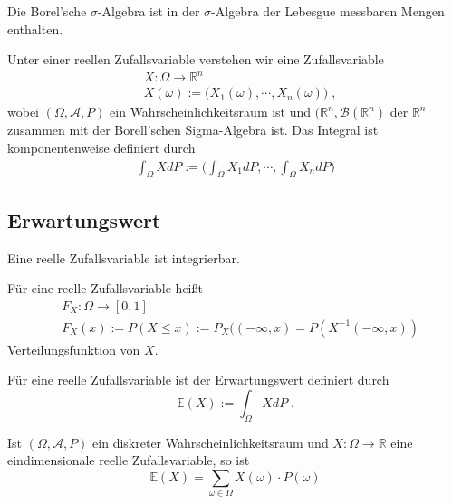 \begin{Satz}
Die Borel'sche   $\sigma$-Algebra ist in der $\sigma$-Algebra der Lebesgue messbaren Mengen enthalten.
\end{Satz}

\begin{Definition}
Unter einer reellen Zufallsvariable verstehen wir eine Zufallsvariable 
\begin{align*}
& X : \Omega \to \mathbb{R}^n \\
& X(\omega) := \biggl(X_1(\omega), \cdots , X_n(\omega)  \biggr) \; ,
\end{align*}
wobei $(\Omega, \mathcal{A}, P)$ ein Wahrscheinlichkeitsraum ist und $(\mathbb{R}^n, \mathcal{B}(\mathbb{R}^n)$ der $\mathbb{R}^n$ zusammen mit der Borell'schen Sigma-Algebra ist. Das Integral ist komponentenweise definiert durch
\begin{align*} 
\int_{\Omega} X dP :=  \biggl( \int_{\Omega} X_1 dP, \cdots , \int_{\Omega} X_n dP    \biggr)
\end{align*}

\end{Definition}


\subsection{Erwartungswert}
\begin{Satz}
Eine reelle Zufallsvariable ist integrierbar.
\end{Satz}

\begin{Definition}
Für eine reelle Zufallsvariable heißt 
\begin{align*} 
& F_X : \Omega \to [0,1] \\
& F_X (x) := P (X \leq x) := P_X (( -\infty, x ) = P(X^{-1} (-\infty, x))
\end{align*}
Verteilungsfunktion von $X$.
\end{Definition}


\begin{Definition}
Für eine reelle Zufallsvariable ist der Erwartungswert definiert durch
$$ \mathbb{E} (X) := \int_{\Omega} X dP \; .$$
\end{Definition}




\begin{Bemerkung}
Ist $(\Omega, \mathcal{A}, P)$ ein diskreter Wahrscheinlichkeitsraum und $X :\Omega \to \mathbb{R}$ eine eindimensionale reelle Zufallsvariable, so ist
$$ \mathbb{E} (X) = \sum_{\omega \in \Omega}  X(\omega) \cdot P(\omega)$$
\end{Bemerkung}


